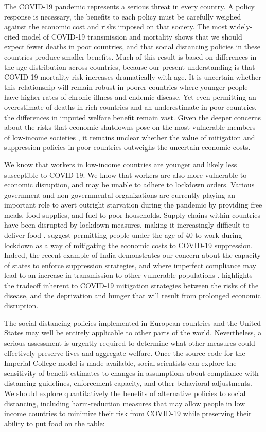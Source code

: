 \documentclass[11pt]{article}
\begin{document}
The COVID-19 pandemic represents a serious threat in every country. A policy response is necessary, the benefits to each policy must be carefully weighed against the economic cost and risks imposed on that society. The most widely-cited model of COVID-19 transmission and mortality shows that we should expect fewer deaths in poor countries, and that social distancing policies in these countries produce smaller benefits. Much of this result is based on differences in the age distribution across countries, because our present understanding is that COVID-19 mortality risk increases dramatically with age. It is uncertain whether this relationship will remain robust in poorer countries where younger people have higher rates of chronic illness and endemic disease. Yet even permitting an overestimate of deaths in rich countries and an underestimate in poor countries, the differences in imputed welfare benefit remain vast. Given the deeper concerns about the risks that economic shutdowns pose on the most vulnerable members of low-income societies \parencite{saleh2020}, it remains unclear whether the value of mitigation and suppression policies in poor countries outweighs the uncertain economic costs. 

We know that workers in low-income countries are younger and likely less susceptible to COVID-19. We know that workers are also more vulnerable to economic disruption, and may be unable to adhere to lockdown orders. Various government and non-governmental organizations are currently playing an important role to avert outright starvation during the pandemic by providing free meals, food supplies, and fuel to poor households. Supply chains within countries have been disrupted by lockdown measures, making it increasingly difficult to deliver food \parencite{purohit2020}. \textcite{ray2020} suggest permitting people under the age of 40 to work during lockdown as a way of mitigating the economic costs to COVID-19 suppression. Indeed, the recent example of India demonstrates our concern about the capacity of states to enforce suppression strategies, and where imperfect compliance may lead to an increase in transmission to other vulnerable populations \parencite{scroll2020}. \textcite{ravallion2020} highlights the tradeoff inherent to COVID-19 mitigation strategies between the risks of the disease, and the deprivation and hunger that will result from prolonged economic disruption. 

The social distancing policies implemented in European countries and the United States may well be entirely applicable to other parts of the world. Nevertheless, a serious assessment is urgently required to determine what other measures could effectively preserve lives and aggregate welfare. Once the source code for the Imperial College model is made available, social scientists can explore the sensitivity of benefit estimates to changes in assumptions about compliance with distancing guidelines, enforcement capacity, and other behavioral adjustments. We should explore quantitatively the benefits of alternative policies to social distancing, including harm-reduction measures that may allow people in low income countries to minimize their risk from COVID-19 while preserving their ability to put food on the table:
\end{document}
